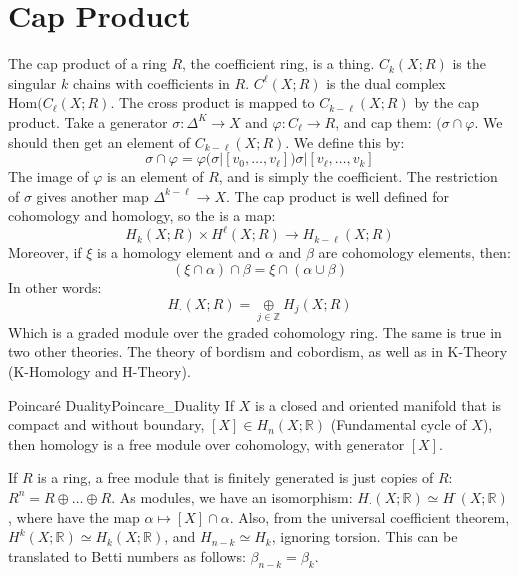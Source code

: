 \section{Cap Product}
    The cap product of a ring $R$, the coefficient ring,
    is a thing. $C_{k}(X;R)$ is the singular $k$ chains with
    coefficients in $R$. $C^{\ell}(X;R)$ is the dual complex
    $\mathrm{Hom}(C_{\ell}(X;R)$. The cross product is mapped
    to $C_{k-\ell}(X;R)$ by the cap product. Take a generator
    $\sigma:\Delta^{K}\rightarrow{X}$ and
    $\varphi:C_{\ell}\rightarrow{R}$, and cap them:
    $(\sigma\cap\varphi$. We should then get an element of
    $C_{k-\ell}(X;R)$. We define this by:
    \begin{equation}
        \sigma\cap\varphi
        =\varphi(\sigma|[v_{0},\dots,v_{\ell}])
            \sigma|[v_{\ell},\dots,v_{k}]
    \end{equation}
    The image of $\varphi$ is an element of $R$, and is simply
    the coefficient. The restriction of $\sigma$ gives another
    map $\Delta^{k-\ell}\rightarrow{X}$. The cap product is well
    defined for cohomology and homology, so the is a map:
    \begin{equation}
        H_{k}(X;R)\times{H}^{\ell}(X;R)\rightarrow
            H_{k-\ell}(X;R)
    \end{equation}
    Moreover, if $\xi$ is a homology element and $\alpha$ and
    $\beta$ are cohomology elements, then:
    \begin{equation}
        (\xi\cap\alpha)\cap\beta=\xi\cap(\alpha\cup\beta)
    \end{equation}
    In other words:
    \begin{equation}
        H_{\cdot}(X;R)=\underset{j\in\mathbb{Z}}{\oplus}
            H_{j}(X;R)
    \end{equation}
    Which is a graded module over the graded cohomology ring.
    The same is true in two other theories. The theory of
    bordism and cobordism, as well as in K-Theory
    (K-Homology and H-Theory).
    \begin{ltheorem}{Poincar\'{e} Duality}{Poincare_Duality}
        If $X$ is a closed and oriented manifold that is
        compact and without boundary,
        $[X]\in{H}_{n}(X;\mathbb{R})$ (Fundamental cycle of $X$),
        then homology is a free module over cohomology, with
        generator $[X]$.
    \end{ltheorem}
    If $R$ is a ring, a free module that is finitely generated
    is just copies of $R$: $R^{n}=R\oplus\dots\oplus{R}$. As
    modules, we have an isomorphism:
    $H_{\cdot}(X;\mathbb{R})\simeq{H}^{\cdot}(X;\mathbb{R})$,
    where have the map $\alpha\mapsto[X]\cap\alpha$. Also, from
    the universal coefficient theorem,
    $H^{k}(X;\mathbb{R})\simeq{H}_{k}(X;\mathbb{R})$, and
    $H_{n-k}\simeq{H}_{k}$, ignoring torsion. This can be
    translated to Betti numbers as follows:
    $\beta_{n-k}=\beta_{k}$.